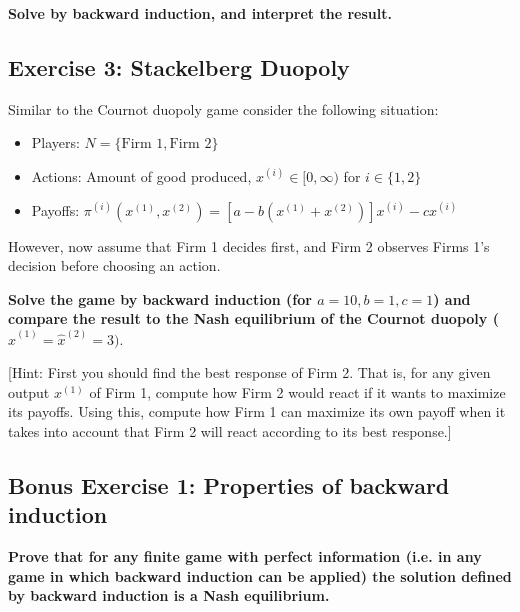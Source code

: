 \documentclass[10pt]{article}
\begin{document}
\textbf{Solve by backward induction, and interpret the result.}

\subsection*{Exercise 3: Stackelberg Duopoly}

Similar to the Cournot duopoly game consider the following situation:

\begin{itemize}
    \item Players: \(N = \{\text{Firm } 1, \text{Firm } 2\}\)
    \item Actions: Amount of good produced, \(x^{(i)} \in [0, \infty)\) for \(i \in \{1, 2\}\)
    \item Payoffs: \(\pi^{(i)}(x^{(1)}, x^{(2)}) = [a - b (x^{(1)} + x^{(2)})] x^{(i)} - c x^{(i)}\)
\end{itemize}

However, now assume that Firm 1 decides first, and Firm 2 observes Firms 1's
decision before choosing an action.

\textbf{Solve the game by backward induction (for \(a=10, b=1, c=1\)) and
compare the result to the Nash equilibrium of the Cournot duopoly
(\(\hat x^{(1)} = \hat x ^{(2)}  = 3)\)}.

[Hint: First you should find the best response of Firm 2. That is, for any given
output \(x^{(1)}\) of Firm 1, compute how Firm 2 would react if it wants to maximize
its payoffs. Using this, compute how Firm 1 can maximize its own payoff when it
takes into account that Firm 2 will react according to its best response.]

\subsection*{Bonus Exercise 1: Properties of backward induction}

\textbf{
Prove that for any finite game with perfect information (i.e. in any game in which
backward induction can be applied) the solution defined by backward induction
is a Nash equilibrium.}
\end{document}
